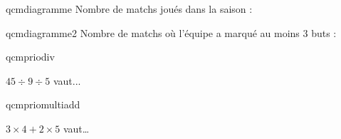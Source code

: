 \documentclass[12pt]{extarticle}
\begin{document}
{\begin{exercicebox}
\begin{minipage}{0.6\textwidth}
            \begin{question}{qcmdiagramme}  
                Nombre de matchs joués dans la saison :
                \begin{reponseshoriz}
                \end{reponseshoriz}
            \end{question}

            \begin{question}{qcmdiagramme2}  
                Nombre de matchs où l’équipe a marqué au moins 3 buts : 
                \begin{reponseshoriz}
                \end{reponseshoriz}
            \end{question}

        \end{minipage}

\end{exercicebox}

\begin{exercicebox}

    \begin{question}{qcmpriodiv}  
        \begin{minipage}{0.20\textwidth}
        $45\div9\div5$ vaut...
        \end{minipage}
        \hfill
        \begin{minipage}{0.7\textwidth}
        \begin{reponseshoriz}
        \end{reponseshoriz}
        \end{minipage}
    \end{question}

    \begin{question}{qcmpriomultiadd}  
        \begin{minipage}{0.20\textwidth}
            $3\times4+2\times5$ vaut…
        \end{minipage}
        \hfill
        \begin{minipage}{0.7\textwidth}
            \begin{reponseshoriz}
            \end{reponseshoriz}
        \end{minipage}
    \end{question}


\end{exercicebox}}
\end{document}
